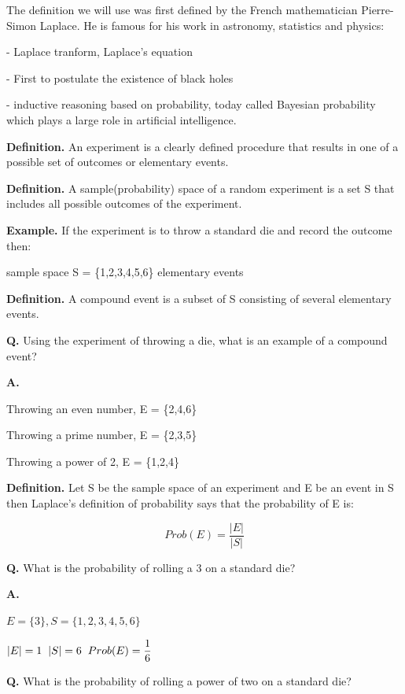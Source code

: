 \documentclass{article}
\begin{document}
The definition we will use was first defined by the French mathematician Pierre-Simon Laplace. He is famous for his work in astronomy, statistics and physics:

- Laplace tranform, Laplace’s equation

- First to postulate the existence of black holes

- inductive reasoning based on probability, today called Bayesian probability which plays a large role in artificial intelligence.

\textbf{Definition.} An experiment is a clearly defined procedure that results in one of a possible set of outcomes or elementary events.

\textbf{Definition.} A sample(probability) space of a random experiment is a set S that includes all possible outcomes of the experiment.

\textbf{Example.} If the experiment is to throw a standard die and record the outcome then:

sample space S = \{1,2,3,4,5,6\} elementary events

\textbf{Definition.} A compound event is a subset of S consisting of several elementary events.

\textbf{Q.} Using the experiment of throwing a die, what is an example of a compound event?

\textbf{A.}

Throwing an even number, E = \{2,4,6\}

Throwing a prime number, E = \{2,3,5\}

Throwing a power of 2, E = \{1,2,4\}

\vspace{0.3cm}


\textbf{Definition.} Let S be the sample space of an experiment and E be an event in S then Laplace’s definition of probability says that the probability of E is:

$$Prob(E) = \dfrac{|E|}{|S|}$$

\textbf{Q.} What is the probability of rolling a 3 on a standard die?

\textbf{A.}

$E = \{3\}, S = \{1,2,3,4,5,6\}$

$|E| = 1 \hspace{0.2cm} |S| = 6 \hspace{0.2cm} Prob(E) = \dfrac{1}{6}$

\vspace{0.3cm}


\textbf{Q.} What is the probability of rolling a power of two on a standard die?
\end{document}
